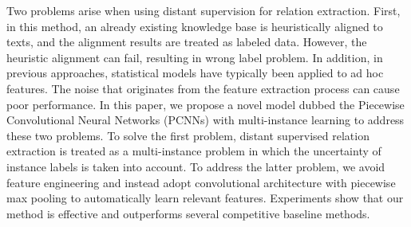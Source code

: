 Two problems arise when using distant supervision for relation extraction. First, in this method, an already existing knowledge base is heuristically aligned to texts, and the alignment results are treated as labeled data. However, the heuristic alignment can fail, resulting in wrong label problem. In addition, in previous approaches, statistical models have typically been applied to ad hoc features. The noise that originates from the feature extraction process can cause poor performance. In this paper, we propose a novel model dubbed the Piecewise Convolutional Neural Networks (PCNNs) with multi-instance learning to address these two problems. To solve the first problem, distant supervised relation extraction is treated as a multi-instance problem in which the uncertainty of instance labels is taken into account. To address the latter problem, we avoid feature engineering and instead adopt convolutional architecture with piecewise max pooling to automatically learn relevant features. Experiments show that our method is effective and outperforms several competitive baseline methods.
